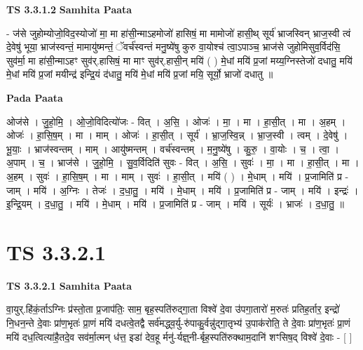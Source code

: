 \documentclass[17pt]{extarticle}
\begin{document}
\textbf{TS 3.3.1.2 } \newline
\textbf{Samhita Paata} \newline

- ज॑से जुहोम्योजो॒विद॒स्योजो॑ मा॒ मा हा॑सी॒न्माऽहमोजो॑ हासिषं॒ मा मामोजो॑ हासी॒थ् सूर्य॑ भ्राजस्विन् भ्राज॒स्वी त्वं दे॒वेषु॑ भूया॒ भ्राज॑स्वन्तं॒ मामायु॑ष्मन्तं॒ ॅवर्च॑स्वन्तं मनु॒ष्ये॑षु कुरु वा॒योश्च॑ त्वा॒ऽपाञ्च॒ भ्राज॑से जुहोमिसुव॒र्विद॑सि॒ सुव॑र्मा॒ मा हा॑सी॒न्माऽहꣳ सुव॑र्.हासिषं॒ मा माꣳ सुव॑र्.हासी॒न् मयि॑ ( ) मे॒धां मयि॑ प्र॒जां मय्य॒ग्निस्तेजो॑ दधातु॒ मयि॑ मे॒धां मयि॑ प्र॒जां मयीन्द्र॑ इन्द्रि॒यं द॑धातु॒ मयि॑ मे॒धां मयि॑ प्र॒जां मयि॒ सूर्यो॒ भ्राजो॑ दधातु ॥ \newline

\textbf{Pada Paata} \newline

ओज॑से । जु॒हो॒मि॒ । ओ॒जो॒विदित्यो॑जः - वित् । अ॒सि॒ । ओजः॑ । मा॒ । मा । हा॒सी॒त् । मा । अ॒हम् । ओजः॑ । हा॒सि॒ष॒म् । मा । माम् । ओजः॑ । हा॒सी॒त् । सूर्य॑ । भ्रा॒ज॒स्वि॒न्न् । भ्रा॒ज॒स्वी । त्वम् । दे॒वेषु॑ । भू॒याः॒ । भ्राज॑स्वन्तम् । माम् । आयु॑ष्मन्तम् । वर्च॑स्वन्तम् । म॒नु॒ष्ये॑षु । कु॒रु॒ । वा॒योः । च॒ । त्वा॒ । अ॒पाम् । च॒ । भ्राज॑से । जु॒हो॒मि॒ । सु॒व॒र्विदिति॑ सुवः - वित् । अ॒सि॒ । सुवः॑ । मा॒ । मा । हा॒सी॒त् । मा । अ॒हम् । सुवः॑ । हा॒सि॒ष॒म् । मा । माम् । सुवः॑ । हा॒सी॒त् । मयि॑ ( ) । मे॒धाम् । मयि॑ । प्र॒जामिति॑ प्र - जाम् । मयि॑ । अ॒ग्निः । तेजः॑ । द॒धा॒तु॒ । मयि॑ । मे॒धाम् । मयि॑ । प्र॒जामिति॑ प्र - जाम् । मयि॑ । इन्द्रः॑ । इ॒न्द्रि॒यम् । द॒धा॒तु॒ । मयि॑ । मे॒धाम् । मयि॑ । प्र॒जामिति॑ प्र - जाम् । मयि॑ । सूर्यः॑ । भ्राजः॑ । द॒धा॒तु॒ ॥  \newline




\section*{ TS 3.3.2.1 }

\textbf{TS 3.3.2.1 } \newline
\textbf{Samhita Paata} \newline

वा॒युर्.हि॑कं॒र्ताऽग्निः प्र॑स्तो॒ता प्र॒जाप॑तिः॒ साम॒ बृह॒स्पति॑रुद्गा॒ता विश्वे॑ दे॒वा उ॑पगा॒तारो॑ म॒रुतः॑ प्रतिह॒र्तार॒ इन्द्रो॑ नि॒धन॒न्ते दे॒वाः प्रा॑ण॒भृतः॑ प्रा॒णं मयि॑ दधत्वे॒तद्वै सर्व॑मद्ध्व॒र्यु-रु॑पाकु॒र्वन्नु॑द्गा॒तृभ्य॑ उ॒पाक॑रोति॒ ते दे॒वाः प्रा॑ण॒भृतः॑ प्रा॒णं मयि॑ दध॒त्वित्या॑है॒तदे॒व सव॑र्मा॒त्मन् ध॑त्त॒ इडा॑ देव॒हू र्मनु॑-र्यज्ञ्॒नी-र्बृह॒स्पति॑रुक्थाम॒दानि॑ शꣳसिष॒द् विश्वे॑ दे॒वाः - [  ] \newline
\end{document}

